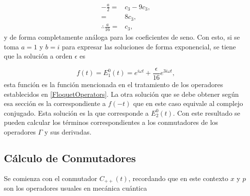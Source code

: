 \documentclass[a4paper,10pt]{report}
\begin{document}
\begin{align*}
-\frac{a}{2} =& c_3 - 9c_3, \\
=& 8c_3, \\
\therefore \frac{a}{16} =& c_3,
\end{align*} y de forma completamente análoga para los coeficientes de seno. Con esto, si se toma $a=1$ y $b=i$ para expresar las soluciones de forma exponencial, se tiene que la solución a orden $\epsilon$ es


\begin{equation}
f(t)= E_1^0(t) = e^{i\omega t} + \frac{\epsilon}{16} e^{3i\omega t},
\end{equation} esta función es la función mencionada en el tratamiento de los operadores establecidos en \eqref{FloquetOperators}. La otra solución que se debe obtener según esa sección es la correspondiente a $f(-t)$ que en este caso equivale al complejo conjugado. Esta solución es la que corresponde a $E_2^0(t)$. Con este resultado se pueden calcular los términos correspondientes a los conmutadores de los operadores $\Gamma$ y sus derivadas.

\subsection{Cálculo de Conmutadores}

Se comienza con el conmutador $C_{++}(t)$, recordando que en este contexto $x$ y $p$ son los operadores usuales en mecánica cuántica
\end{document}
